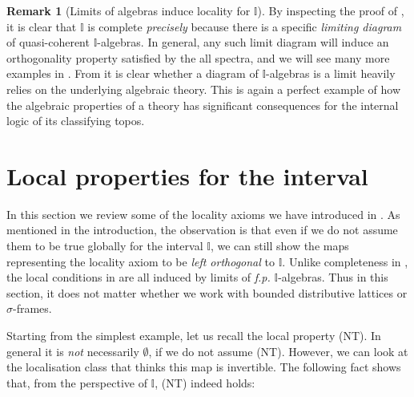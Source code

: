 \documentclass[a4paper,12pt]{amsart}
\theoremstyle{definition}
\newtheorem{remark}[theorem]{Remark}
\newcommand{\mbb}[1]{\mathbb{#1}}
\newcommand{\I}{\mbb I}
\newcommand{\emp}{\emptyset}
\newcommand{\spec}{\operatorname{Spec}}
\begin{document}
\begin{remark}[Limits of algebras induce locality for $\I$]\label{rem:limofalgloc}
  By inspecting the proof of , it is clear that $\I$ is complete \emph{precisely} because there is a specific \emph{limiting diagram} of quasi-coherent $\I$-algebras. In general, any such limit diagram will induce an orthogonality property satisfied by the all spectra, and we will see many more examples in . From  it is clear whether a diagram of $\I$-algebras is a limit heavily relies on the underlying algebraic theory. This is again a perfect example of how the algebraic properties of a theory has significant consequences for the internal logic of its classifying topos.
\end{remark}

\section{Local properties for the interval}\label{sec:local}

In this section we review some of the locality axioms we have introduced in . As mentioned in the introduction, the observation is that even if we do not assume them to be true globally for the interval $\I$, we can still show the maps representing the locality axiom to be \emph{left orthogonal} to $\I$.  
Unlike completeness in , the local conditions in  are all induced by limits of \emph{f.p.} $\I$-algebras. Thus in this section, it does not matter whether we work with bounded distributive lattices or $\sigma$-frames.

Starting from the simplest example, let us recall the local property (NT). In general it is \emph{not} necessarily $\emp$, if we do not assume (NT). However, we can look at the localisation class that thinks this map is invertible. The following fact shows that, from the perspective of $\I$, (NT) indeed holds:
\end{document}
